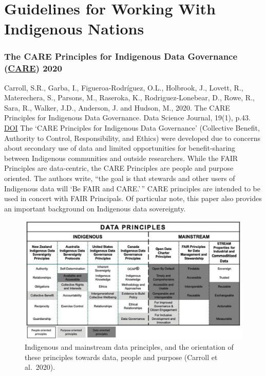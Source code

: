 \documentclass[
]{book}
\begin{document}
\hypertarget{guidelines-for-working-with-indigenous-nations}{%
\section{Guidelines for Working With Indigenous Nations}\label{guidelines-for-working-with-indigenous-nations}}

\hypertarget{the-care-principles-for-indigenous-data-governance-care-2020}{%
\subsubsection*{\texorpdfstring{The CARE Principles for Indigenous Data Governance (\href{http://doi.org/10.5334/dsj-2020-043}{CARE}) \textbar{} 2020}{The CARE Principles for Indigenous Data Governance (CARE) \textbar{} 2020}}\label{the-care-principles-for-indigenous-data-governance-care-2020}}

Carroll, S.R., Garba, I., Figueroa-Rodríguez, O.L., Holbrook, J., Lovett, R., Materechera, S., Parsons, M., Raseroka, K., Rodriguez-Lonebear, D., Rowe, R., Sara, R., Walker, J.D., Anderson, J. and Hudson, M., 2020. The CARE Principles for Indigenous Data Governance. Data Science Journal, 19(1), p.43. \href{http://doi.org/10.5334/dsj-2020-043}{DOI}
The `CARE Principles for Indigenous Data Governance' (Collective Benefit, Authority to Control, Responsibility, and Ethics) were developed due to concerns about secondary use of data and limited opportunities for benefit-sharing between Indigenous communities and outside researchers. While the FAIR Principles are data-centric, the CARE Principles are people and purpose oriented. The authors write, ``the goal is that stewards and other users of Indigenous data will `Be FAIR and CARE.'\,'' CARE principles are intended to be used in concert with FAIR Principals. Of particular note, this paper also provides an important background on Indigenous data sovereignty.

\begin{figure}
\centering
\includegraphics{images/care.png}
\caption{\label{fig:unnamed-chunk-5}Indigenous and mainstream data principles, and the orientation of these principles towards data, people and purpose (Carroll et al.~2020).}
\end{figure}
\end{document}
